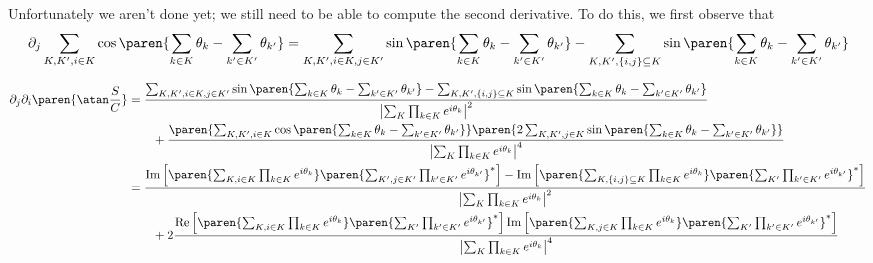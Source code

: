 \documentclass[onecolumn,amsmath,amssymb,nofootinbib,floatfix]{revtex4}
\begin{document}
Unfortunately we aren't done yet;  we still need to be able to compute the second derivative.  To do this, we first observe that
$$\partial_j \sum_{K,K',i\in K}\cos\paren{\sum_{k\in K} \theta_k - \sum_{k'\in K'} \theta_{k'}} = \sum_{K,K',i\in K,j\in K'}\sin\paren{\sum_{k\in K} \theta_k - \sum_{k'\in K'} \theta_{k'}} - \sum_{K,K',\{i,j\}\subseteq K}\sin\paren{\sum_{k\in K} \theta_k - \sum_{k'\in K'} \theta_{k'}}
$$

$$
\begin{aligned}
\partial_j \partial_i \paren{\atan\frac{S}{C}}
&= \frac{\sum_{K,K',i\in K,j\in K'}\sin\paren{\sum_{k\in K} \theta_k - \sum_{k'\in K'} \theta_{k'}} - \sum_{K,K',\{i,j\}\subseteq K}\sin\paren{\sum_{k\in K} \theta_k - \sum_{k'\in K'} \theta_{k'}}}{\left|\sum_{K}\prod_{k\in K}e^{i\theta_k}\right|^2}\\
&\qquad+ \frac{\paren{\sum_{K,K',i\in K}\cos\paren{\sum_{k\in K} \theta_k - \sum_{k'\in K'} \theta_{k'}}}\paren{2\sum_{K,K',j\in K}\sin\paren{\sum_{k\in K} \theta_k - \sum_{k'\in K'} \theta_{k'}}}}{\left|\sum_{K}\prod_{k\in K}e^{i\theta_k}\right|^4}\\
&= \frac{\text{Im}\left[\paren{\sum_{K,i\in K}\prod_{k\in K}e^{i\theta_k}}\paren{\sum_{K',j\in K'}\prod_{k'\in K'}e^{i\theta_{k'}}}^*\right]-\text{Im}\left[\paren{\sum_{K,\{i,j\}\subseteq K}\prod_{k\in K}e^{i\theta_k}}\paren{\sum_{K'}\prod_{k'\in K'}e^{i\theta_{k'}}}^*\right]}{\left|\sum_{K}\prod_{k\in K}e^{i\theta_k}\right|^2}\\
&\qquad+ 2\frac{\text{Re}\left[\paren{\sum_{K,i\in K}\prod_{k\in K}e^{i\theta_k}}\paren{\sum_{K'}\prod_{k'\in K'}e^{i\theta_{k'}}}^*\right]\text{Im}\left[\paren{\sum_{K,j\in K}\prod_{k\in K}e^{i\theta_k}}\paren{\sum_{K'}\prod_{k'\in K'}e^{i\theta_{k'}}}^*\right]}{\left|\sum_{K}\prod_{k\in K}e^{i\theta_k}\right|^4}
\end{aligned}
$$
\end{document}
